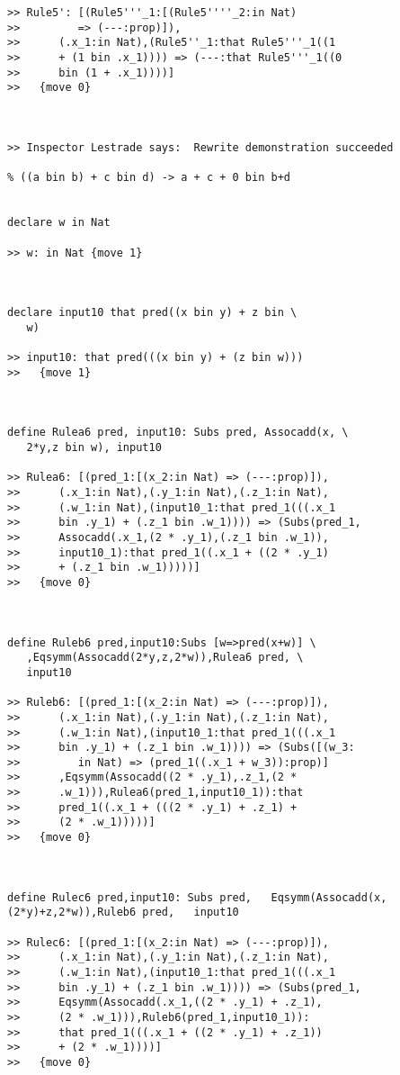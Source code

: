\documentclass{article}
\begin{document}
\begin{verbatim}
>> Rule5': [(Rule5'''_1:[(Rule5''''_2:in Nat)
>>         => (---:prop)]),
>>      (.x_1:in Nat),(Rule5''_1:that Rule5'''_1((1
>>      + (1 bin .x_1)))) => (---:that Rule5'''_1((0
>>      bin (1 + .x_1))))]
>>   {move 0}



>> Inspector Lestrade says:  Rewrite demonstration succeeded

% ((a bin b) + c bin d) -> a + c + 0 bin b+d


declare w in Nat

>> w: in Nat {move 1}



declare input10 that pred((x bin y) + z bin \
   w)

>> input10: that pred(((x bin y) + (z bin w)))
>>   {move 1}



define Rulea6 pred, input10: Subs pred, Assocadd(x, \
   2*y,z bin w), input10

>> Rulea6: [(pred_1:[(x_2:in Nat) => (---:prop)]),
>>      (.x_1:in Nat),(.y_1:in Nat),(.z_1:in Nat),
>>      (.w_1:in Nat),(input10_1:that pred_1(((.x_1
>>      bin .y_1) + (.z_1 bin .w_1)))) => (Subs(pred_1,
>>      Assocadd(.x_1,(2 * .y_1),(.z_1 bin .w_1)),
>>      input10_1):that pred_1((.x_1 + ((2 * .y_1)
>>      + (.z_1 bin .w_1)))))]
>>   {move 0}



define Ruleb6 pred,input10:Subs [w=>pred(x+w)] \
   ,Eqsymm(Assocadd(2*y,z,2*w)),Rulea6 pred, \
   input10

>> Ruleb6: [(pred_1:[(x_2:in Nat) => (---:prop)]),
>>      (.x_1:in Nat),(.y_1:in Nat),(.z_1:in Nat),
>>      (.w_1:in Nat),(input10_1:that pred_1(((.x_1
>>      bin .y_1) + (.z_1 bin .w_1)))) => (Subs([(w_3:
>>         in Nat) => (pred_1((.x_1 + w_3)):prop)]
>>      ,Eqsymm(Assocadd((2 * .y_1),.z_1,(2 *
>>      .w_1))),Rulea6(pred_1,input10_1)):that
>>      pred_1((.x_1 + (((2 * .y_1) + .z_1) +
>>      (2 * .w_1)))))]
>>   {move 0}



define Rulec6 pred,input10: Subs pred,   Eqsymm(Assocadd(x,(2*y)+z,2*w)),Ruleb6 pred,   input10

>> Rulec6: [(pred_1:[(x_2:in Nat) => (---:prop)]),
>>      (.x_1:in Nat),(.y_1:in Nat),(.z_1:in Nat),
>>      (.w_1:in Nat),(input10_1:that pred_1(((.x_1
>>      bin .y_1) + (.z_1 bin .w_1)))) => (Subs(pred_1,
>>      Eqsymm(Assocadd(.x_1,((2 * .y_1) + .z_1),
>>      (2 * .w_1))),Ruleb6(pred_1,input10_1)):
>>      that pred_1(((.x_1 + ((2 * .y_1) + .z_1))
>>      + (2 * .w_1))))]
>>   {move 0}




\end{verbatim}
\end{document}
